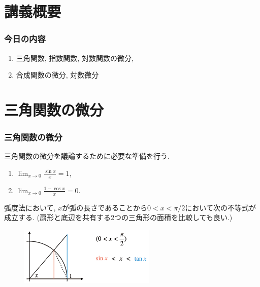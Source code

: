 \section{講義概要}


\begin{frame}
\frametitle{今日の内容}



\begin{enumerate}
\item 三角関数, 指数関数, 対数関数の微分,
\item 合成関数の微分, 対数微分
\end{enumerate} 



\end{frame}






\section{三角関数の微分}

\begin{frame}
\frametitle{三角関数の微分}


\vspace{-4mm}

三角関数の微分を議論するために必要な準備を行う. 

\vspace{-1mm}

\begin{Thm} \label{準備}
\begin{enumerate}
\item $\displaystyle\lim_{x \to 0} \frac{\sin x}{x}=1$, 
\item  $\displaystyle \lim_{x \to 0} \frac{1-\cos x}{x}=0$. 
\end{enumerate}
\end{Thm}
弧度法において, $x$が弧の長さであることから$0<x<\pi/2$において次の不等式が成立する. 
(扇形と底辺を共有する2つの三角形の面積を比較しても良い.)
\vspace{-6mm}

 \begin{figure}[htbp]
 \begin{center} 
  \includegraphics[width=65mm]{calculus5/sintan.png}
 \end{center}
\end{figure}

\vspace{-10mm}

\end{frame}





